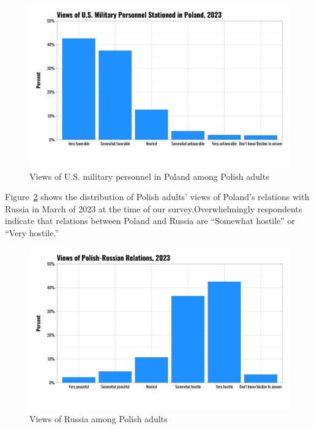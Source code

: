 \documentclass[
  10,
  letterpaper,
  DIV=11,
  numbers=noendperiod]{scrartcl}
\begin{document}
\begin{figure}

{\centering \includegraphics{../Figures/views-us-troops.png}

}

\caption{\label{fig-views-us-troops}Views of U.S. military personnel in
Poland among Polish adults}

\end{figure}

Figure~\ref{fig-views-russia} shows the distribution of Polish adults'
views of Poland's relations with Russia in March of 2023 at the time of
our survey.Overwhelmingly respondents indicate that relations between
Poland and Russia are ``Somewhat hostile'' or ``Very hostile.''

\begin{figure}

{\centering \includegraphics{../Figures/views-russian-relations.png}

}

\caption{\label{fig-views-russia}Views of Russia among Polish adults}

\end{figure}
\end{document}
